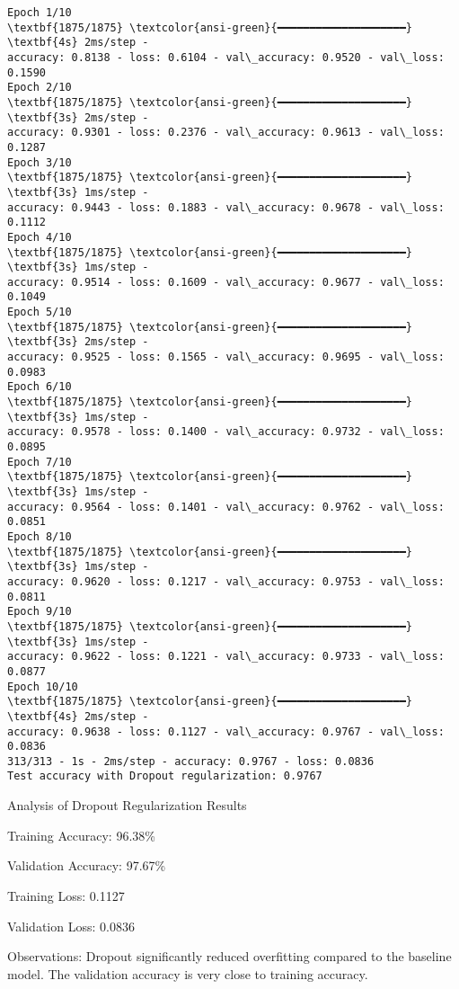 \documentclass[11pt]{article}
\begin{document}
    \begin{Verbatim}[commandchars=\\\{\}]
Epoch 1/10
\textbf{1875/1875} \textcolor{ansi-green}{━━━━━━━━━━━━━━━━━━━━} \textbf{4s} 2ms/step -
accuracy: 0.8138 - loss: 0.6104 - val\_accuracy: 0.9520 - val\_loss: 0.1590
Epoch 2/10
\textbf{1875/1875} \textcolor{ansi-green}{━━━━━━━━━━━━━━━━━━━━} \textbf{3s} 2ms/step -
accuracy: 0.9301 - loss: 0.2376 - val\_accuracy: 0.9613 - val\_loss: 0.1287
Epoch 3/10
\textbf{1875/1875} \textcolor{ansi-green}{━━━━━━━━━━━━━━━━━━━━} \textbf{3s} 1ms/step -
accuracy: 0.9443 - loss: 0.1883 - val\_accuracy: 0.9678 - val\_loss: 0.1112
Epoch 4/10
\textbf{1875/1875} \textcolor{ansi-green}{━━━━━━━━━━━━━━━━━━━━} \textbf{3s} 1ms/step -
accuracy: 0.9514 - loss: 0.1609 - val\_accuracy: 0.9677 - val\_loss: 0.1049
Epoch 5/10
\textbf{1875/1875} \textcolor{ansi-green}{━━━━━━━━━━━━━━━━━━━━} \textbf{3s} 2ms/step -
accuracy: 0.9525 - loss: 0.1565 - val\_accuracy: 0.9695 - val\_loss: 0.0983
Epoch 6/10
\textbf{1875/1875} \textcolor{ansi-green}{━━━━━━━━━━━━━━━━━━━━} \textbf{3s} 1ms/step -
accuracy: 0.9578 - loss: 0.1400 - val\_accuracy: 0.9732 - val\_loss: 0.0895
Epoch 7/10
\textbf{1875/1875} \textcolor{ansi-green}{━━━━━━━━━━━━━━━━━━━━} \textbf{3s} 1ms/step -
accuracy: 0.9564 - loss: 0.1401 - val\_accuracy: 0.9762 - val\_loss: 0.0851
Epoch 8/10
\textbf{1875/1875} \textcolor{ansi-green}{━━━━━━━━━━━━━━━━━━━━} \textbf{3s} 1ms/step -
accuracy: 0.9620 - loss: 0.1217 - val\_accuracy: 0.9753 - val\_loss: 0.0811
Epoch 9/10
\textbf{1875/1875} \textcolor{ansi-green}{━━━━━━━━━━━━━━━━━━━━} \textbf{3s} 1ms/step -
accuracy: 0.9622 - loss: 0.1221 - val\_accuracy: 0.9733 - val\_loss: 0.0877
Epoch 10/10
\textbf{1875/1875} \textcolor{ansi-green}{━━━━━━━━━━━━━━━━━━━━} \textbf{4s} 2ms/step -
accuracy: 0.9638 - loss: 0.1127 - val\_accuracy: 0.9767 - val\_loss: 0.0836
313/313 - 1s - 2ms/step - accuracy: 0.9767 - loss: 0.0836
Test accuracy with Dropout regularization: 0.9767
    \end{Verbatim}

    Analysis of Dropout Regularization Results

Training Accuracy: 96.38\%

Validation Accuracy: 97.67\%

Training Loss: 0.1127

Validation Loss: 0.0836

Observations: Dropout significantly reduced overfitting compared to the
baseline model. The validation accuracy is very close to training
accuracy.
\end{document}
